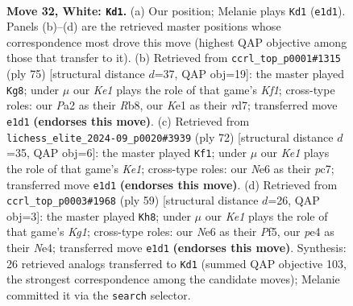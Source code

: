 \documentclass[11pt]{article}
\begin{document}
\clearpage

\begin{figure}[p]\centering
\begin{subfigure}{0.46\textwidth}\centering
\resizebox{\linewidth}{!}{%
\newchessgame
\chessboard[
  setfen={8/pp5R/k3N3/2p2p2/4p3/8/PPr2r1P/1R2K3 w - - 2 32},
  showmover=false,
  pgfstyle=straightmove, color=movearrow, markmove={e1-d1}
]}
\caption{}
\end{subfigure}\hfill
\begin{subfigure}{0.46\textwidth}\centering
\resizebox{\linewidth}{!}{%
\newchessgame
\chessboard[
  setfen={1r3k2/1p1R3R/p3p1p1/3n4/5P2/7P/PP3KP1/2r5 b - - 12 38},
  showmover=false,
  pgfstyle=straightmove, color=movearrow, markmove={f8-g8}
]}
\caption{}
\end{subfigure}
\\[4pt]
\begin{subfigure}{0.46\textwidth}\centering
\resizebox{\linewidth}{!}{%
\newchessgame
\chessboard[
  setfen={7R/P1p2pp1/6k1/2P4p/8/6P1/4r1rP/R3K3 w - - 19 37},
  showmover=false,
  pgfstyle=straightmove, color=movearrow, markmove={e1-f1}
]}
\caption{}
\end{subfigure}\hfill
\begin{subfigure}{0.46\textwidth}\centering
\resizebox{\linewidth}{!}{%
\newchessgame
\chessboard[
  setfen={3r2k1/R5Rp/8/5p2/3pnP2/6P1/1r2P2P/6K1 b - - 0 30},
  showmover=false,
  pgfstyle=straightmove, color=movearrow, markmove={g8-h8}
]}
\caption{}
\end{subfigure}
\caption{\textbf{Move 32, White: \texttt{Kd1}.} (a) Our position; Melanie plays \texttt{Kd1} (\texttt{e1d1}). Panels (b)--(d) are the retrieved master positions whose correspondence most drove this move (highest QAP objective among those that transfer to it). (b) Retrieved from \texttt{ccrl\_top\_p0001\#1315} (ply 75) [structural distance $d$=37, QAP obj=19]: the master played \texttt{Kg8}; under $\mu$ our \emph{Ke1} plays the role of that game's \emph{Kf1}; cross-type roles: our \emph{P}a2 as their \emph{R}b8, our \emph{K}e1 as their \emph{r}d7; transferred move \texttt{e1d1} \textbf{(endorses this move)}. (c) Retrieved from \texttt{lichess\_elite\_2024-09\_p0020\#3939} (ply 72) [structural distance $d$=35, QAP obj=6]: the master played \texttt{Kf1}; under $\mu$ our \emph{Ke1} plays the role of that game's \emph{Ke1}; cross-type roles: our \emph{N}e6 as their \emph{p}c7; transferred move \texttt{e1d1} \textbf{(endorses this move)}. (d) Retrieved from \texttt{ccrl\_top\_p0003\#1968} (ply 59) [structural distance $d$=26, QAP obj=3]: the master played \texttt{Kh8}; under $\mu$ our \emph{Ke1} plays the role of that game's \emph{Kg1}; cross-type roles: our \emph{N}e6 as their \emph{P}f5, our \emph{p}e4 as their \emph{N}e4; transferred move \texttt{e1d1} \textbf{(endorses this move)}. Synthesis: 26 retrieved analogs transferred to \texttt{Kd1} (summed QAP objective 103, the strongest correspondence among the candidate moves); Melanie committed it via the \texttt{search} selector.}
\label{fig:thought-m62}
\end{figure}
\end{document}
